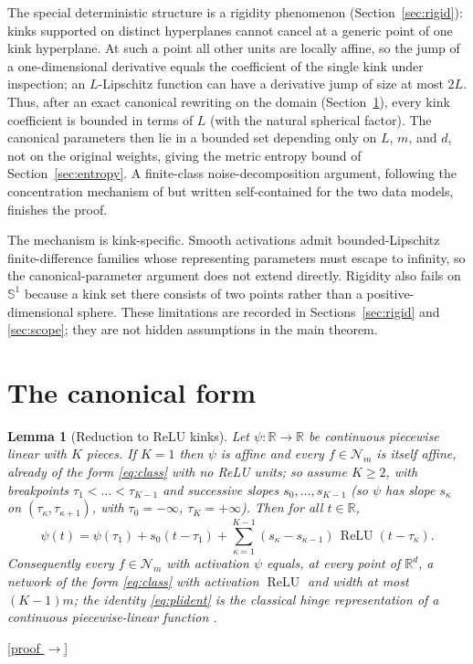 \documentclass[11pt,reqno]{amsart}
\theoremstyle{plain}
\newtheorem{lemma}[theorem]{Lemma}
\theoremstyle{definition}
\theoremstyle{remark}
\newcommand{\R}{\mathbb{R}}
\newcommand{\relu}{\operatorname{ReLU}}
\newcommand{\NN}{\mathcal{N}}
\newcommand{\proofbutton}[1]{\hyperref[proof:#1]{\textnormal{\footnotesize\textsf{[proof $\to$]}}}}
\begin{document}
The special deterministic structure is a rigidity phenomenon (Section~\ref{sec:rigid}): kinks supported on distinct hyperplanes cannot cancel at a generic point of one kink hyperplane. At such a point all other units are locally affine, so the jump of a one-dimensional derivative equals the coefficient of the single kink under inspection; an $L$-Lipschitz function can have a derivative jump of size at most $2L$. Thus, after an exact canonical rewriting on the domain (Section~\ref{sec:canonical}), every kink coefficient is bounded in terms of $L$ (with the natural spherical factor). The canonical parameters then lie in a bounded set depending only on $L$, $m$, and $d$, not on the original weights, giving the metric entropy bound of Section~\ref{sec:entropy}. A finite-class noise-decomposition argument, following the concentration mechanism of \cite{BS} but written self-contained for the two data models, finishes the proof.

The mechanism is kink-specific. Smooth activations admit bounded-Lipschitz finite-difference families whose representing parameters must escape to infinity, so the canonical-parameter argument does not extend directly. Rigidity also fails on $\mathbb S^1$ because a kink set there consists of two points rather than a positive-dimensional sphere. These limitations are recorded in Sections~\ref{sec:rigid} and \ref{sec:scope}; they are not hidden assumptions in the main theorem.


\section{The canonical form}\label{sec:canonical}

\begin{lemma}[Reduction to ReLU kinks]\label{lem:pl}
Let $\psi:\R\to\R$ be continuous piecewise linear with $K$ pieces. If $K=1$ then $\psi$ is affine and every $f\in\NN_m$ is itself affine, already of the form \eqref{eq:class} with no ReLU units; so assume $K\ge2$, with breakpoints $\tau_1<\dots<\tau_{K-1}$ and successive slopes $s_0,\dots,s_{K-1}$ (so $\psi$ has slope $s_\kappa$ on $(\tau_\kappa,\tau_{\kappa+1})$, with $\tau_0=-\infty$, $\tau_K=+\infty$). Then for all $t\in\R$,
\begin{equation}\label{eq:plident}
\psi(t)=\psi(\tau_1)+s_0(t-\tau_1)+\sum_{\kappa=1}^{K-1}(s_\kappa-s_{\kappa-1})\,\relu(t-\tau_\kappa).
\end{equation}
Consequently every $f\in\NN_m$ with activation $\psi$ equals, at every point of $\R^d$, a network of the form \eqref{eq:class} with activation $\relu$ and width at most $(K-1)m$; the identity \eqref{eq:plident} is the classical hinge representation of a continuous piecewise-linear function \cite{Breiman,AroraBMM}.
\end{lemma}
\proofbutton{pl}
\end{document}
